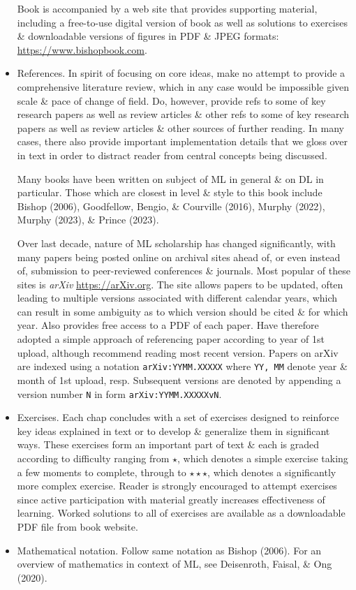 \documentclass{article}
\begin{document}
\begin{itemize}
	Book is accompanied by a web site that provides supporting material, including a free-to-use digital version of book as well as solutions to exercises \& downloadable versions of figures in PDF \& JPEG formats: \url{https://www.bishopbook.com}.
	\item {\sf References.} In spirit of focusing on core ideas, make no attempt to provide a comprehensive literature review, which in any case would be impossible given scale \& pace of change of field. Do, however, provide refs to some of key research papers as well as review articles \& other refs to some of key research papers as well as review articles \& other sources of further reading. In many cases, there also provide important implementation details that we gloss over in text in order to distract reader from central concepts being discussed.

	Many books have been written on subject of ML in general \& on DL in particular. Those which are closest in level \& style to this book include Bishop (2006), Goodfellow, Bengio, \& Courville (2016), Murphy (2022), Murphy (2023), \& Prince (2023).

	Over last decade, nature of ML scholarship has changed significantly, with many papers being posted online on archival sites ahead of, or even instead of, submission to peer-reviewed conferences \& journals. Most popular of these sites is {\it arXiv} \url{https://arXiv.org}. The site allows papers to be updated, often leading to multiple versions associated with different calendar years, which can result in some ambiguity as to which version should be cited \& for which year. Also provides free access to a PDF of each paper. Have therefore adopted a simple approach of referencing paper according to year of 1st upload, although recommend reading most recent version. Papers on arXiv are indexed using a notation {\tt arXiv:YYMM.XXXXX} where {\tt YY, MM} denote year \& month of 1st upload, resp. Subsequent versions are denoted by appending a version number {\tt N} in form {\tt arXiv:YYMM.XXXXXvN}.
	\item {\sf Exercises.} Each chap concludes with a set of exercises designed to reinforce key ideas explained in text or to develop \& generalize them in significant ways. These exercises form an important part of text \& each is graded according to difficulty ranging from $\star$, which denotes a simple exercise taking a few moments to complete, through to $\star\star\star$, which denotes a significantly more complex exercise. Reader is strongly encouraged to attempt exercises since active participation with material greatly increases effectiveness of learning. Worked solutions to all of exercises are available as a downloadable PDF file from book website.
	\item {\sf Mathematical notation.} Follow same notation as Bishop (2006). For an overview of mathematics in context of ML, see Deisenroth, Faisal, \& Ong (2020).


\end{itemize}
\end{document}
